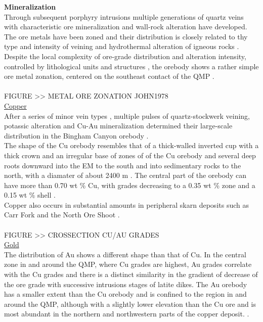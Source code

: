 \documentclass[a4paper,11pt,titlepage]{article}
\begin{document}
\vspace*{10pt}
\textbf{Mineralization}
\\ Through subsequent porphyry intrusions multiple generations of quartz veins with characteristic ore mineralization and wall-rock alteration have developed. The ore metals have been zoned and their distribution is closely related to thy type and intensity of veining and hydrothermal alteration of igneous rocks \citep{Rose1970,Atkinson1978a,John1978,Babcock1995,Phillips1997,Redmond2001,Redmond2010a,Gruen2010}.
\\ Despite the local complexity of ore-grade distribution and alteration intensity, controlled by lithological units and structures \citep{Redmond2010a}, the orebody shows a rather simple ore metal zonation, centered on the southeast contact of the QMP \citep{Gruen2010}.
\\
\\FIGURE >> METAL ORE ZONATION JOHN1978
\\\underline{Copper}
\\ After a series of minor vein types \citep{Redmond2010a}, multiple pulses of quartz-stockwerk veining, potassic alteration and Cu-Au mineralization determined their large-scale distribution in the Bingham Canyon orebody \citep{Gruen2010}. 
\\The shape of the Cu orebody resembles that of a thick-walled inverted cup with a thick crown and an irregular base of zones of of the Cu orebody and several deep roots downward into the EM to the south and into sedimentary rocks to the north, with a diamater of about 2400 m \citep{Bamford1977,Ballantyne1997,Redmond2001,Gruen2010}. The central part of the orebody can have more than 0.70 wt \% Cu, with grades decreasing to a 0.35 wt \% zone and a 0.15 wt \% shell \citep{Gruen2010}.
\\ Copper also occurs in substantial amounts in peripheral skarn deposits such as Carr Fork and the North Ore Shoot \citep{Atkinson1978a}.
\\
\\FIGURE >> CROSSECTION CU/AU GRADES
\\\underline{Gold}
\\ The distribution of Au shows a different shape than that of Cu. In the central zone in and around the QMP, where Cu grades are highest, Au grades correlate with the Cu grades and there is a distinct similarity in the gradient of decrease of the ore grade with successive intrusions stages of latite dikes. The Au orebody has a smaller extent than the Cu orebody and is confined to the region in and around the QMP, although with a slightly lower elevation than the Cu ore \citep{Ballantyne1997} and is most abundant in the northern and northwestern parts of the copper deposit. \citep{Gruen2010}.
\end{document}
